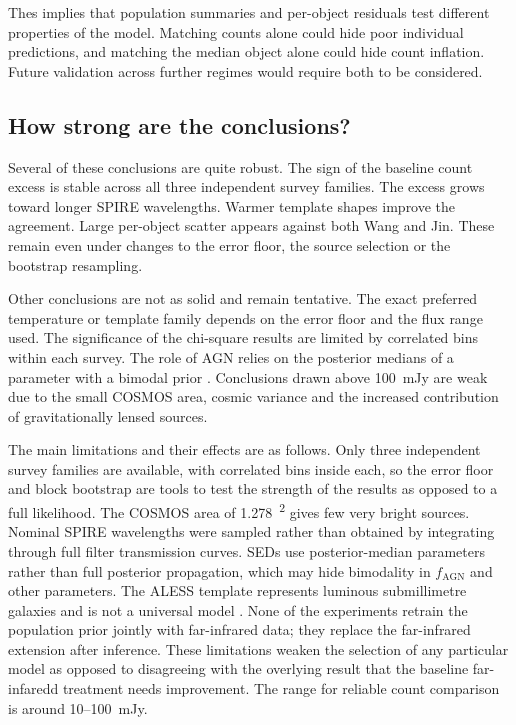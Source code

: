 \documentclass[12pt,a4paper]{article}
\begin{document}
Thes implies that population summaries and per-object residuals test different
properties of the model. Matching counts alone could hide poor individual predictions,
and matching the median object alone could hide count inflation. Future validation across further regimes would require both to be considered.

\subsection{How strong are the conclusions?}
\label{sec:discussion:strength}

Several of these conclusions are quite robust. The sign of the baseline count excess is stable across
all three independent survey families. The excess grows toward longer SPIRE wavelengths.
Warmer template shapes improve the agreement. Large per-object scatter appears against
both Wang and Jin. These remain even under changes to the error floor, the source selection or
the bootstrap resampling.

Other conclusions are not as solid and remain tentative. The exact preferred temperature or template family
depends on the error floor and the flux range used. The significance of the
chi-square results are limited by correlated bins within each survey. The role of AGN
relies on the posterior medians of a parameter with a bimodal prior
\citep{Thorp_2025_insights}. Conclusions drawn above \SI{100}{mJy} are weak due to the
small COSMOS area, cosmic variance and the increased contribution of gravitationally
lensed sources.

The main limitations and their effects are as follows. Only three independent survey
families are available, with correlated bins inside each, so the error floor and block
bootstrap are tools to test the strength of the results as opposed to a full likelihood. The COSMOS area of
\SI{1.278}{\deg\squared} gives few very bright sources. Nominal SPIRE wavelengths were
sampled rather than obtained by integrating through full filter transmission curves. SEDs use
posterior-median parameters rather than full posterior propagation, which may hide
bimodality in $f_\mathrm{AGN}$ and other parameters. The ALESS template represents
luminous submillimetre galaxies and is not a universal model
\citep{daCunha_2015}. None of the experiments retrain the population prior jointly
with far-infrared data; they replace the far-infrared extension after
inference. These limitations weaken the selection of any particular model as opposed to disagreeing with the overlying result that the baseline far-infaredd treatment needs improvement. The range for reliable
count comparison is around 10--\SI{100}{mJy}.
\end{document}
